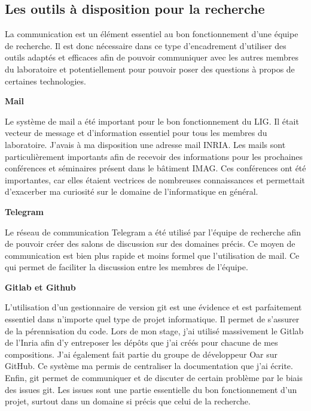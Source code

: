 \documentclass[a4paper,french,12pt, titlepage]{article}
\begin{document}
\newpage

\hypertarget{les-outils-uxe0-disposition-pour-la-recherche}{%
\subsection{Les outils à disposition pour la
recherche}\label{les-outils-uxe0-disposition-pour-la-recherche}}

La communication est un élément essentiel au bon fonctionnement d'une
équipe de recherche. Il est donc nécessaire dans ce type d'encadrement
d'utiliser des outils adaptés et efficaces afin de pouvoir communiquer
avec les autres membres du laboratoire et potentiellement pour pouvoir
poser des questions à propos de certaines technologies.\newline

\textbf{Mail}\newline

Le système de mail a été important pour le bon fonctionnement du LIG. Il
était vecteur de message et d'information essentiel pour tous les
membres du laboratoire. J'avais à ma disposition une adresse mail INRIA.
Les mails sont particulièrement importants afin de recevoir des
informations pour les prochaines conférences et séminaires présent dans
le bâtiment IMAG. Ces conférences ont été importantes, car elles étaient
vectrices de nombreuses connaissances et permettait d'exacerber ma
curiosité sur le domaine de l'informatique en général.\newline

\textbf{Telegram}\newline

Le réseau de communication Telegram a été utilisé par l'équipe de
recherche afin de pouvoir créer des salons de discussion sur des
domaines précis. Ce moyen de communication est bien plus rapide et moins
formel que l'utilisation de mail. Ce qui permet de faciliter la
discussion entre les membres de l'équipe.\newline

\textbf{Gitlab et Github}\newline

L'utilisation d'un gestionnaire de version git est une évidence et est
parfaitement essentiel dans n'importe quel type de projet informatique.
Il permet de s'assurer de la pérennisation du code. Lors de mon stage,
j'ai utilisé massivement le Gitlab de l'Inria afin d'y entreposer les
dépôts que j'ai créés pour chacune de mes compositions. J'ai également
fait partie du groupe de développeur Oar sur GitHub. Ce système ma
permis de centraliser la documentation que j'ai écrite. Enfin, git
permet de communiquer et de discuter de certain problème par le biais
des issues git. Les issues sont une partie essentielle du bon
fonctionnement d'un projet, surtout dans un domaine si précis que celui
de la recherche.
\end{document}
